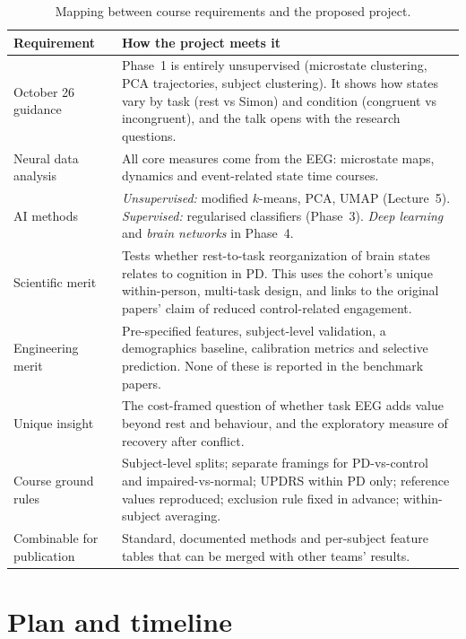 \documentclass[11pt,a4paper]{article}
\begin{document}
\begin{table}[h]
\centering
\small
\begin{tabularx}{\textwidth}{>{\raggedright\arraybackslash}p{3.6cm} L}
\toprule
Requirement & How the project meets it \\
\midrule
October 26 guidance & Phase~1 is entirely unsupervised (microstate clustering, PCA trajectories, subject clustering). It shows how states vary by task (rest vs Simon) and condition (congruent vs incongruent), and the talk opens with the research questions. \\
Neural data analysis & All core measures come from the EEG: microstate maps, dynamics and event-related state time courses. \\
AI methods & \emph{Unsupervised:} modified $k$-means, PCA, UMAP (Lecture~5). \emph{Supervised:} regularised classifiers (Phase~3). \emph{Deep learning} and \emph{brain networks} in Phase~4. \\
Scientific merit & Tests whether rest-to-task reorganization of brain states relates to cognition in PD. This uses the cohort's unique within-person, multi-task design, and links to the original papers' claim of reduced control-related engagement. \\
Engineering merit & Pre-specified features, subject-level validation, a demographics baseline, calibration metrics and selective prediction. None of these is reported in the benchmark papers. \\
Unique insight & The cost-framed question of whether task EEG adds value beyond rest and behaviour, and the exploratory measure of recovery after conflict. \\
Course ground rules & Subject-level splits; separate framings for PD-vs-control and impaired-vs-normal; UPDRS within PD only; reference values reproduced; exclusion rule fixed in advance; within-subject averaging. \\
Combinable for publication & Standard, documented methods and per-subject feature tables that can be merged with other teams' results. \\
\bottomrule
\end{tabularx}
\caption{Mapping between course requirements and the proposed project.}
\end{table}

\section{Plan and timeline}
\end{document}
